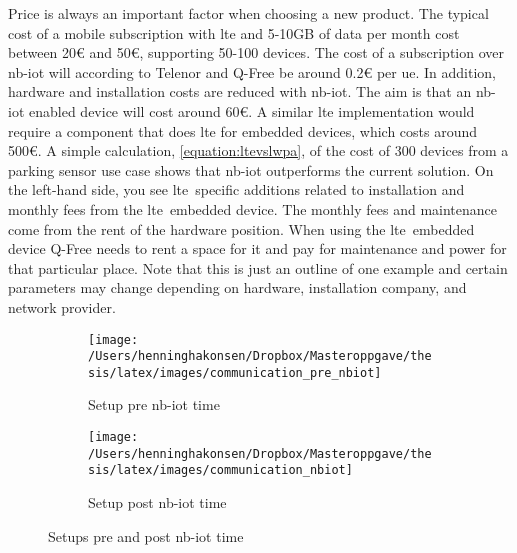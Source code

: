 \documentclass[USenglish]{ifimaster}  %
\begin{document}
Price is always an important factor when choosing a new product. The typical cost of a mobile subscription with \acrshort{lte} and 5-10GB of data per month cost between 20€ and 50€, supporting 50-100 devices. The cost of a subscription over \acrshort{nb-iot} will according to Telenor and Q-Free be around 0.2€ per \acrshort{ue}. In addition, hardware and installation costs are reduced with \acrshort{nb-iot}. The aim is that an \acrshort{nb-iot} enabled device will cost around 60€. A similar \acrshort{lte} implementation would require a component that does \acrshort{lte} for embedded devices, which costs around 500€. A simple calculation, \vref{equation:ltevslwpa}, of the cost of 300 devices from a parking sensor use case shows that \acrshort{nb-iot} outperforms the current solution. On the left-hand side, you see \acrshort{lte} specific additions related to installation and monthly fees from the \acrshort{lte} embedded device. The monthly fees and maintenance come from the rent of the hardware position. When using the \acrshort{lte} embedded device Q-Free needs to rent a space for it and pay for maintenance and power for that particular place. Note that this is just an outline of one example and certain parameters may change depending on hardware, installation company, and network provider.

\begin{figure}
\centering
\begin{subfigure}{.5\textwidth}
  \centering
  \texttt{[image: /Users/henninghakonsen/Dropbox/Masteroppgave/thesis/latex/images/communication\_pre\_nbiot]}
  \caption{Setup pre \acrshort{nb-iot} time}
  \label{fig:sub1}
\end{subfigure}%
\begin{subfigure}{.5\textwidth}
  \centering
  \texttt{[image: /Users/henninghakonsen/Dropbox/Masteroppgave/thesis/latex/images/communication\_nbiot]}
  \caption{Setup post \acrshort{nb-iot} time}
  \label{fig:sub2}
\end{subfigure}
\caption[Cost comparison figure]{Setups pre and post \acrshort{nb-iot} time\cite{communication_prepost_nbiot}}
\label{pic:costcomparisonfig}
\end{figure}
\end{document}
